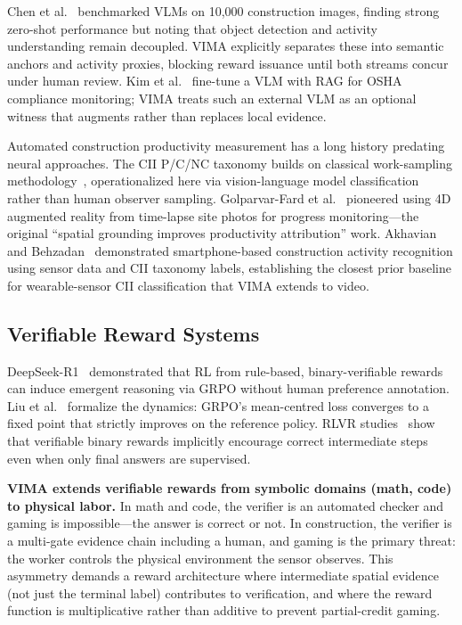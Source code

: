 \documentclass[sigconf,nonacm]{acmart}
\begin{document}
Chen et al.~\cite{chen2025vlm_construction} benchmarked VLMs on 10,000 construction images, finding strong zero-shot performance but noting that object detection and activity understanding remain decoupled.
VIMA explicitly separates these into semantic anchors and activity proxies, blocking reward issuance until both streams concur under human review.
Kim et al.~\cite{kim2025optimizing} fine-tune a VLM with RAG for OSHA compliance monitoring; VIMA treats such an external VLM as an optional witness that augments rather than replaces local evidence.

Automated construction productivity measurement has a long history predating neural approaches.
The CII P/C/NC taxonomy builds on classical work-sampling methodology~\cite{cii252}, operationalized here via vision-language model classification rather than human observer sampling.
Golparvar-Fard et al.~\cite{golparvar2011d4ar} pioneered using 4D augmented reality from time-lapse site photos for progress monitoring---the original ``spatial grounding improves productivity attribution'' work.
Akhavian and Behzadan~\cite{akhavian2016smartphone} demonstrated smartphone-based construction activity recognition using sensor data and CII taxonomy labels, establishing the closest prior baseline for wearable-sensor CII classification that VIMA extends to video.

\subsection{Verifiable Reward Systems}

DeepSeek-R1~\cite{guo2025deepseekr1} demonstrated that RL from rule-based, binary-verifiable rewards can induce emergent reasoning via GRPO without human preference annotation.
Liu et al.~\cite{liu2025grpo} formalize the dynamics: GRPO's mean-centred loss converges to a fixed point that strictly improves on the reference policy.
RLVR studies~\cite{rlvr_reasoning2025} show that verifiable binary rewards implicitly encourage correct intermediate steps even when only final answers are supervised.

\textbf{VIMA extends verifiable rewards from symbolic domains (math, code) to physical labor.}
In math and code, the verifier is an automated checker and gaming is impossible---the answer is correct or not.
In construction, the verifier is a multi-gate evidence chain including a human, and gaming is the primary threat: the worker controls the physical environment the sensor observes.
This asymmetry demands a reward architecture where intermediate spatial evidence (not just the terminal label) contributes to verification, and where the reward function is multiplicative rather than additive to prevent partial-credit gaming.
\end{document}
